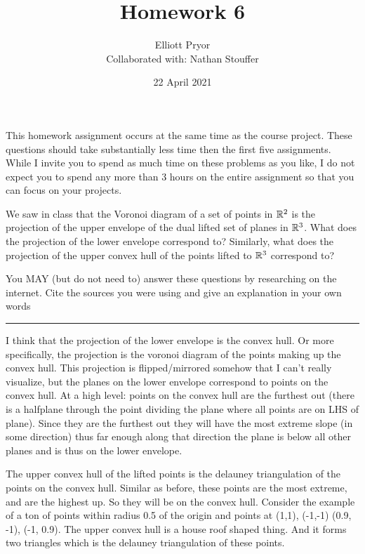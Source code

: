 \documentclass[11pt]{article}
\title{Homework 6}
\author{Elliott Pryor \\
Collaborated with: Nathan Stouffer}
\date{22 April 2021}
\begin{document}
\maketitle

This homework assignment occurs at the same time as the course project.  These
questions should take substantially less time then the first five assignments.
While I invite you to spend as much time on these problems as you like, I do not
expect you to spend any more than 3 hours on the entire assignment so that you
can focus on your projects.



We saw in class that the Voronoi diagram of a set of points in $\mathbb{R}^2$ is the
projection of the upper envelope of the dual lifted set of planes in $\mathbb{R}^3$.
What does the projection of the lower envelope correspond to? Similarly, what
does the projection of the upper convex hull of the points lifted to $\mathbb{R}^3$
correspond to?

You MAY (but do not need to) answer these questions by researching on the
internet. Cite the sources you were using and give an explanation in your own
words

\hrule

I think that the projection of the lower envelope is the convex hull.
Or more specifically, the projection is the voronoi diagram of the points making up the convex hull.
This projection is flipped/mirrored somehow that I can't really visualize, but the 
planes on the lower envelope correspond to points on the convex hull.
At a high level: points on the convex hull are the furthest out (there is a halfplane through
the point dividing the plane where all points are on LHS of plane). 
Since they are the furthest out they will have the most extreme slope (in some direction)
thus far enough along that direction the plane is below all other planes and is thus on the lower envelope.



The upper convex hull of the lifted points is the delauney triangulation of the points
on the convex hull. Similar as before, these points are the most extreme, and are the highest up. 
So they will be on the convex hull. 
Consider the example of a ton of points within radius 0.5 of the origin and points at (1,1), (-1,-1)
(0.9, -1), (-1, 0.9). The upper convex hull is a house roof shaped thing. And it forms
two triangles which is the delauney triangulation of these points.
\end{document}
